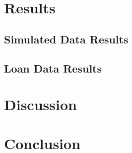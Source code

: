 \documentclass[information,article,submit,moreauthors,pdftex]{definitions/mdpi}
\begin{document}
\section{Results}\label{sec:res}

\subsection{Simulated Data Results}

\subsection{Loan Data Results}

\section{Discussion}\label{sec:disc}






\section{Conclusion}\label{sec:con}


\vspace{6pt} 
\end{document}
